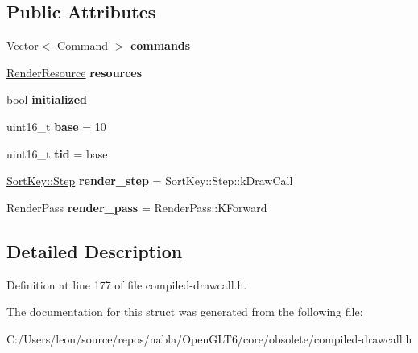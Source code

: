 \subsection*{Public Attributes}
\begin{DoxyCompactItemize}
\item 
\mbox{\label{structnabla_1_1renderer_1_1_render_context_a1ea5e52dd7d1609b309efa5e39f01f7b}} 
\mbox{\hyperlink{classnabla_1_1_s_t_l_vector_ex}{Vector}}$<$ \mbox{\hyperlink{structnabla_1_1renderer_1_1_command}{Command}} $>$ {\bfseries commands}
\item 
\mbox{\label{structnabla_1_1renderer_1_1_render_context_aac36ced9018458cd311290963051309e}} 
\mbox{\hyperlink{structnabla_1_1renderer_1_1_render_resource}{Render\+Resource}} {\bfseries resources}
\item 
\mbox{\label{structnabla_1_1renderer_1_1_render_context_a386de39564b09cf905e08f14772b63fe}} 
bool {\bfseries initialized}
\item 
\mbox{\label{structnabla_1_1renderer_1_1_render_context_adc6502c7bf729327769c5ac1e9cde76f}} 
uint16\+\_\+t {\bfseries base} = 10
\item 
\mbox{\label{structnabla_1_1renderer_1_1_render_context_aa1eda97a8f81d2563a5ae3e48f33d54e}} 
uint16\+\_\+t {\bfseries tid} = base
\item 
\mbox{\label{structnabla_1_1renderer_1_1_render_context_ab1f692080e2e4d2c5fb0ecc74c6d32bf}} 
\mbox{\hyperlink{structnabla_1_1renderer_1_1_sort_key_ae0121b7c60133bb8c0bf82785307f53a}{Sort\+Key\+::\+Step}} {\bfseries render\+\_\+step} = Sort\+Key\+::\+Step\+::k\+Draw\+Call
\item 
\mbox{\label{structnabla_1_1renderer_1_1_render_context_a71a4102700dd51f0600b4b794406f0b4}} 
Render\+Pass {\bfseries render\+\_\+pass} = Render\+Pass\+::\+K\+Forward
\end{DoxyCompactItemize}


\subsection{Detailed Description}


Definition at line 177 of file compiled-\/drawcall.\+h.



The documentation for this struct was generated from the following file\+:\begin{DoxyCompactItemize}
\item 
C\+:/\+Users/leon/source/repos/nabla/\+Open\+G\+L\+T6/core/obsolete/compiled-\/drawcall.\+h\end{DoxyCompactItemize}
